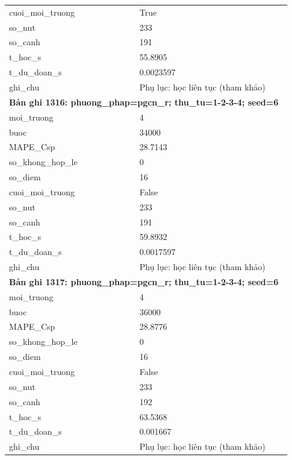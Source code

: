 \begin{longtable}{p{0.43\linewidth}p{0.50\linewidth}}
cuoi\_\allowbreak moi\_\allowbreak truong & True \\
so\_\allowbreak nut & 233 \\
so\_\allowbreak canh & 191 \\
t\_\allowbreak hoc\_\allowbreak s & 55.8905 \\
t\_\allowbreak du\_\allowbreak doan\_\allowbreak s & 0.0023597 \\
ghi\_\allowbreak chu & Phụ lục: học liên tục (tham khảo) \\
\midrule
\multicolumn{2}{p{0.95\linewidth}}{\textbf{Bản ghi 1316: phuong\_phap=pgcn\_r; thu\_tu=1-2-3-4; seed=6}} \\
moi\_\allowbreak truong & 4 \\
buoc & 34000 \\
MAPE\_\allowbreak Csp & 28.7143 \\
so\_\allowbreak khong\_\allowbreak hop\_\allowbreak le & 0 \\
so\_\allowbreak diem & 16 \\
cuoi\_\allowbreak moi\_\allowbreak truong & False \\
so\_\allowbreak nut & 233 \\
so\_\allowbreak canh & 191 \\
t\_\allowbreak hoc\_\allowbreak s & 59.8932 \\
t\_\allowbreak du\_\allowbreak doan\_\allowbreak s & 0.0017597 \\
ghi\_\allowbreak chu & Phụ lục: học liên tục (tham khảo) \\
\midrule
\multicolumn{2}{p{0.95\linewidth}}{\textbf{Bản ghi 1317: phuong\_phap=pgcn\_r; thu\_tu=1-2-3-4; seed=6}} \\
moi\_\allowbreak truong & 4 \\
buoc & 36000 \\
MAPE\_\allowbreak Csp & 28.8776 \\
so\_\allowbreak khong\_\allowbreak hop\_\allowbreak le & 0 \\
so\_\allowbreak diem & 16 \\
cuoi\_\allowbreak moi\_\allowbreak truong & False \\
so\_\allowbreak nut & 233 \\
so\_\allowbreak canh & 192 \\
t\_\allowbreak hoc\_\allowbreak s & 63.5368 \\
t\_\allowbreak du\_\allowbreak doan\_\allowbreak s & 0.001667 \\
ghi\_\allowbreak chu & Phụ lục: học liên tục (tham khảo) \\

\end{longtable}
